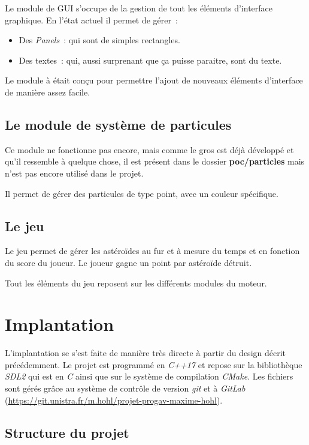 \documentclass[10pt, french, a4paper]{report}
\begin{document}
Le module de GUI s'occupe de la gestion de tout les éléments d'interface graphique.
En l'état actuel il permet de gérer~:
\begin{itemize}
	\item Des \textit{Panels}~: qui sont de simples rectangles.
	\item Des textes~: qui, aussi surprenant que ça puisse paraitre, sont du texte.
\end{itemize}

Le module à était conçu pour permettre l'ajout de nouveaux éléments d'interface de 
manière assez facile. 

\section{Le module de système de particules}

Ce module ne fonctionne pas encore, mais comme le gros est déjà développé et qu'il 
ressemble à quelque chose, il est présent dans le dossier \textbf{poc/particles} 
mais n'est pas encore utilisé dans le projet.

Il permet de gérer des particules de type point, avec un couleur spécifique.

\section{Le jeu}

Le jeu permet de gérer les astéroïdes au fur et à mesure du temps et en fonction 
du score du joueur. 
Le joueur gagne un point par astéroïde détruit. 

Tout les éléments du jeu reposent sur les différents modules du moteur.


\chapter{Implantation}

L'implantation se s'est faite de manière très directe à partir du design décrit 
précédemment.
Le projet est programmé en \textit{C++17} et repose sur la bibliothèque \textit{SDL2}
qui est en \textit{C} ainsi que sur le système de compilation \textit{CMake}.
Les fichiers sont gérés grâce au système de contrôle de version \textit{git} 
et à \textit{GitLab} (\url{https://git.unistra.fr/m.hohl/projet-progav-maxime-hohl}).

\section{Structure du projet}
\end{document}
